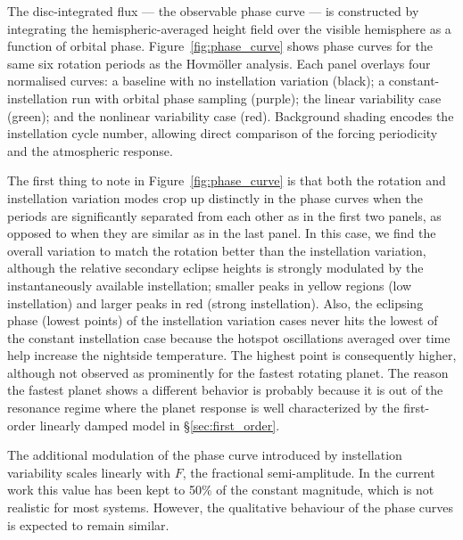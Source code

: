 \documentclass[trackchanges,twocolumn]{aastex7}
\begin{document}
The disc-integrated flux — the observable phase curve — is constructed by integrating the hemispheric-averaged height field over the visible hemisphere as a function of orbital phase. Figure~\ref{fig:phase_curve} shows phase curves for the same six rotation periods as the Hovmöller analysis. Each panel overlays four normalised curves: a baseline with no instellation variation (black); a constant-instellation run with orbital phase sampling (purple); the linear variability case (green); and the nonlinear variability case (red). Background shading encodes the instellation cycle number, allowing direct comparison of the forcing periodicity and the atmospheric response.



The first thing to note in Figure~\ref{fig:phase_curve} is that both the rotation and instellation variation modes crop up distinctly in the phase curves when the periods are significantly separated from each other as in the first two panels, as opposed to when they are similar as in the last panel. In this case, we find the overall variation to match the rotation better than the instellation variation, although the relative secondary eclipse heights is strongly modulated by the instantaneously available instellation; smaller peaks in yellow regions (low instellation) and larger peaks in red (strong instellation). Also, the eclipsing phase (lowest points) of the instellation variation cases never hits the lowest of the constant instellation case because the hotspot oscillations averaged over time help increase the nightside temperature. The highest point is consequently higher, although not observed as prominently for the fastest rotating planet. The reason the fastest planet shows a different behavior is probably because it is out of the resonance regime where the planet response is well characterized by the first-order linearly damped model in \S \ref{sec:first_order}.

The additional modulation of the phase curve introduced by instellation variability scales linearly with $F$, the fractional semi-amplitude. In the current work this value has been kept to 50$\%$ of the constant magnitude, which is not realistic for most systems. However, the qualitative behaviour of the phase curves is expected to remain similar. 
\end{document}
